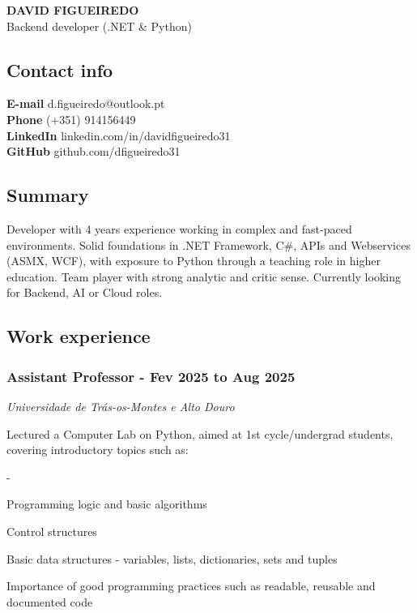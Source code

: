 \documentclass[a4paper,11pt]{article}
\renewenvironment{itemize}{
  \begin{list}
    {-}
    {
      \setlength{\leftmargin}{1em}
      \setlength{\itemsep}{-0.3em}
      \setlength{\parskip}{0em}
      \setlength{\parsep}{0em}
    }
}{
  \end{list}
}
\begin{document}
  \begin{center}
    \MakeUppercase{\huge \textbf{David Figueiredo}}\\Backend developer
(.NET \& Python)
  \end{center}

    \subsection{Contact info}\label{contact-info}

    \textbf{E-mail} d.figueiredo@outlook.pt\\
    \textbf{Phone} (+351) 914156449\\
    \textbf{LinkedIn} linkedin.com/in/davidfigueiredo31\\
    \textbf{GitHub} github.com/dfigueiredo31

    \subsection{Summary}\label{summary}

    Developer with 4 years experience working in complex and fast-paced
    environments. Solid foundations in .NET Framework, C\#, APIs and
    Webservices (ASMX, WCF), with exposure to Python through a teaching
    role in higher education. Team player with strong analytic and
    critic sense. Currently looking for Backend, AI or Cloud roles.

    \subsection{Work experience}\label{work-experience}

    \subsubsection{Assistant Professor - Fev 2025 to Aug
    2025}\label{assistant-professor---fev-2025-to-aug-2025}

    \emph{Universidade de Trás-os-Montes e Alto Douro}

    Lectured a Computer Lab on Python, aimed at 1st cycle/undergrad
    students, covering introductory topics such as:

    \begin{itemize}
    \item
      Programming logic and basic algorithms
    \item
      Control structures
    \item
      Basic data structures - variables, lists, dictionaries, sets and
      tuples
    \item
      Importance of good programming practices such as readable,
      reusable and documented code
    \end{itemize}
\end{document}
